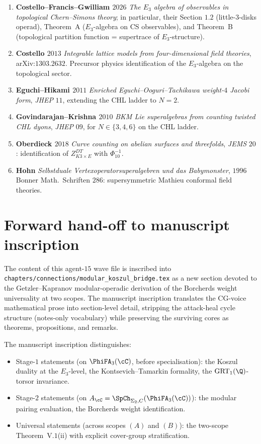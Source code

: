 \begin{enumerate}[label=\textup{(\arabic*)}]
{and GKM superalgebras}, arXiv:$2004.09030$; \S$4$ Gritsenko lift and
Conjecture $1$ on the $8$-form correspondence to twined elliptic genera.
\item \textbf{Costello--Francis--Gwilliam $2026$} \emph{The $E_3$
algebra of observables in topological Chern--Simons theory}; in
particular, their Section $1.2$ (little-$3$-disks operad), Theorem~A
($E_3$-algebra on CS observables), and Theorem~B (topological partition
function = supertrace of $E_3$-structure).
\item \textbf{Costello $2013$} \emph{Integrable lattice models from
four-dimensional field theories}, arXiv:$1303.2632$. Precursor physics
identification of the $E_3$-algebra on the topological sector.
\item \textbf{Eguchi--Hikami $2011$} \emph{Enriched Eguchi--Ooguri--Tachikawa
weight-$4$ Jacobi form}, \emph{JHEP} $11$, extending the CHL ladder to
$N = 2$.
\item \textbf{Govindarajan--Krishna $2010$} \emph{BKM Lie superalgebras
from counting twisted CHL dyons}, \emph{JHEP} $09$, for
$N \in \{3, 4, 6\}$ on the CHL ladder.
\item \textbf{Oberdieck $2018$} \emph{Curve counting on abelian surfaces
and threefolds}, \emph{JEMS} $20$: identification of $Z^{DT}_{K3 \times E}$
with $\Phi_{10}^{-1}$.
\item \textbf{Hohn} \emph{Selbstduale Vertexoperatorsuperalgebren und
das Babymonster}, $1996$ Bonner Math.~Schriften $286$: supersymmetric
Mathieu conformal field theories.
\end{enumerate}


\section{Forward hand-off to manuscript inscription}

The content of this agent-$15$ wave file is inscribed into
\texttt{chapters/connections/modular\_koszul\_bridge.tex} as a new
section devoted to the Getzler--Kapranov modular-operadic derivation
of the Borcherds weight universality at two scopes. The manuscript
inscription translates the CG-voice mathematical prose into
section-level detail, stripping the attack-heal cycle structure
(notes-only vocabulary) while preserving the surviving cores as
theorems, propositions, and remarks.

The manuscript inscription distinguishes:
\begin{itemize}
\item Stage-$1$ statements (on $\PhiFA_3(\cC)$, before specialisation):
the Koszul duality at the $E_3$-level, the Kontsevich--Tamarkin
formality, the $\mathrm{GRT}_1(\Q)$-torsor invariance.
\item Stage-$2$ statements (on $A_\cC = \SpCh_{\Sigma_2, C}(\PhiFA_3(\cC))$):
the modular pairing evaluation, the Borcherds weight identification.
\item Universal statements (across scopes $(A)$ and $(B)$): the
two-scope Theorem~V.$1$(ii) with explicit cover-group stratification.
\end{itemize}

